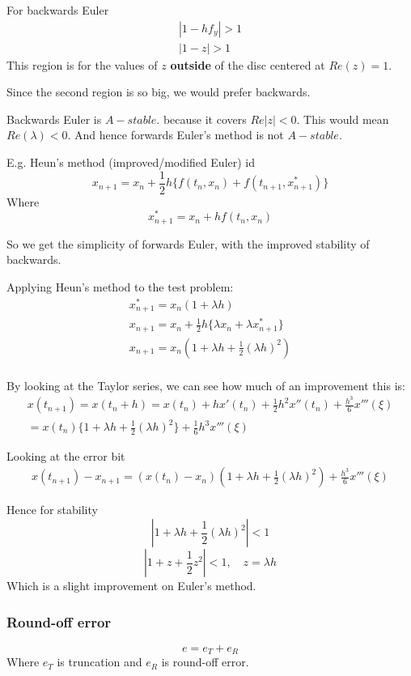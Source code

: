 \documentclass{X:/Documents/Coding/Latex/myassignment}
\begin{document}
For backwards Euler 
\begin{align*}
    |1-hf_y| >1\\
    |1-z| >1
\end{align*}
This region is for the values of $z$ \textbf{outside} of the disc centered at $Re(z) = 1$.

Since the second region is so big, we would prefer backwards.

Backwards Euler is $A-stable$. because it covers $Re|z|<0$. This would mean $Re(\lambda) < 0$. 
And hence forwards Euler's method is not $A-stable$. 


E.g. Heun's method (improved/modified Euler) id
\[x_{n+1} = x_n + \frac12 h \{f(t_n,x_n) + f(t_{n+1},x^*_{n+1})\}\]
Where 
\[x^*_{n+1} = x_n + hf(t_n,x_n)\]

So we get the simplicity of forwards Euler, with the improved stability of backwards.

Applying Heun's method to the test problem:
\begin{align*}
    x_{n+1}^* = x_n(1+\lambda h)\\
    x_{n+1} = x_n + \frac12h\{\lambda x_n + \lambda x_{n+1}^*\}\\
    x_{n+1} = x_n\left(1 + \lambda h + \frac12 (\lambda h)^2\right)\\
\end{align*}

By looking at the Taylor series, we can see how much of an improvement this is:
\begin{align*}
    x(t_{n+1}) = x(t_n + h) = x(t_n) + hx'(t_n) + \frac12 h^2 x''(t_n) + \frac{h^3}{6} x'''(\xi)\\
    =x(t_n) \{1 + \lambda h + \frac12(\lambda h )^2\} + \frac16 h^3 x'''(\xi)
\end{align*}

Looking at the error bit
\begin{align*}
    x(t_{n+1}) - x_{n+1} = \left(x(t_n) - x_n\right)\left(1 + \lambda h + \frac12 (\lambda h)^2\right) + \frac{h^3}{6} x'''(\xi)
\end{align*}

Hence for stability
\[|1 + \lambda h + \frac12 (\lambda h)^2| < 1\]
\[|1 + z + \frac12 z^2| < 1, \quad z =\lambda h\]
Which is a slight improvement on Euler's method.

\subsubsection{Round-off error}
\[e = e_T + e_R\]
Where $e_T$ is truncation and $e_R$ is round-off error. 
\end{document}
